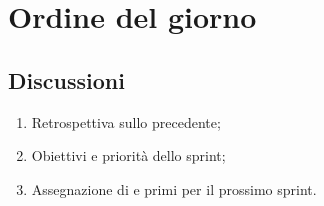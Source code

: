 \section{Ordine del giorno} \label{sec:agenda}
\subsection{Discussioni} \label{subsec:discussione}
\begin{enumerate}
    \item Retrospettiva sullo  precedente;
    \item Obiettivi e priorità dello sprint;
    \item Assegnazione di  e primi  per il prossimo sprint.
\end{enumerate}
